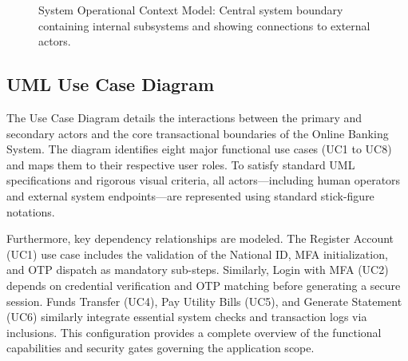 \documentclass[11pt,a4paper]{article}
\begin{document}
\begin{figure}[H]
\caption{System Operational Context Model: Central system boundary containing internal subsystems and showing connections to external actors.}
\label{fig:context_model}
\end{figure}

\newpage

\subsection{UML Use Case Diagram}
The Use Case Diagram details the interactions between the primary and secondary actors and the core transactional boundaries of the Online Banking System. The diagram identifies eight major functional use cases (UC1 to UC8) and maps them to their respective user roles. To satisfy standard UML specifications and rigorous visual criteria, all actors—including human operators and external system endpoints—are represented using standard stick-figure notations. 

Furthermore, key dependency relationships are modeled. The Register Account (UC1) use case includes the validation of the National ID, MFA initialization, and OTP dispatch as mandatory sub-steps. Similarly, Login with MFA (UC2) depends on credential verification and OTP matching before generating a secure session. Funds Transfer (UC4), Pay Utility Bills (UC5), and Generate Statement (UC6) similarly integrate essential system checks and transaction logs via inclusions. This configuration provides a complete overview of the functional capabilities and security gates governing the application scope.
\end{document}

